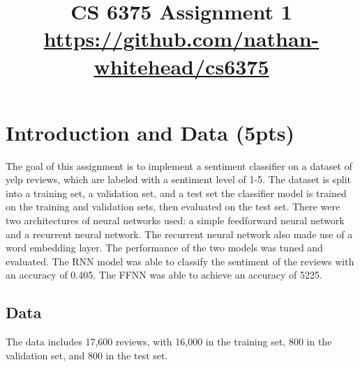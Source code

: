 \documentclass[conference]{IEEEtran}
\begin{document}
\title{CS 6375 Assignment 1 \\
\href{https://github.com/nathan-whitehead/cs6375}{https://github.com/nathan-whitehead/cs6375}
}

\author{
}

\maketitle


\section{Introduction and Data (5pts)}

The goal of this assignment is to implement a sentiment classifier on a dataset of yelp reviews, which are labeled with a sentiment level of 1-5. The dataset is split into a training set, a validation set, and a test set the classifier model is trained on the training and validation sets, then evaluated on the test set. There were two architectures of neural networks used: a simple feedforward neural network and a recurrent neural network. The recurrent neural network also made use of a word embedding layer. The performance of the two models was tuned and evaluated. 
The RNN model was able to classify the sentiment of the reviews with an accuracy of 0.405. 
The FFNN was able to achieve an accuracy of 5225.

\subsection{Data} 

The data includes 17,600 reviews, with 16,000 in the training set, 800 in the validation set, and 800 in the test set. 

\end{document}
